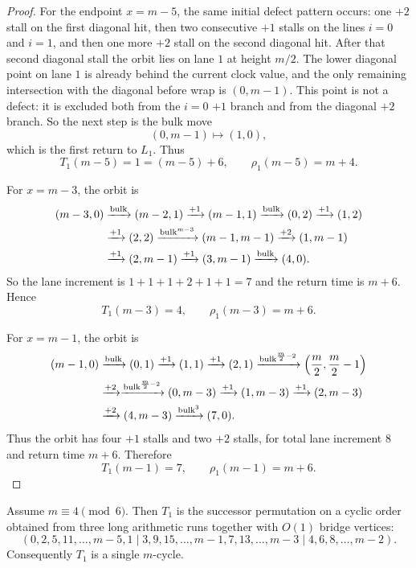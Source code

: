 \begin{proof}
For the endpoint $x=m-5$, the same initial defect pattern occurs: one $+2$ stall on the first diagonal hit,
then two consecutive $+1$ stalls on the lines $i=0$ and $i=1$, and then one more $+2$ stall on the second
diagonal hit.
After that second diagonal stall the orbit lies on lane $1$ at height $m/2$.
The lower diagonal point on lane $1$ is already behind the current clock value, and the only remaining
intersection with the diagonal before wrap is $(0,m-1)$.
This point is not a defect: it is excluded both from the $i=0$ $+1$ branch and from the diagonal $+2$
branch.
So the next step is the bulk move
\[
(0,m-1)\mapsto(1,0),
\]
which is the first return to $L_1$.
Thus
\[
T_1(m-5)=1=(m-5)+6,\qquad \rho_1(m-5)=m+4.
\]

For $x=m-3$, the orbit is
\[
\begin{aligned}
(m-3,0)&\xrightarrow{\mathrm{bulk}}(m-2,1)\xrightarrow{+1}(m-1,1)\xrightarrow{\mathrm{bulk}}(0,2)\xrightarrow{+1}(1,2)\\
&\xrightarrow{+1}(2,2)\xrightarrow{\mathrm{bulk}^{m-3}}(m-1,m-1)\xrightarrow{+2}(1,m-1)\\
&\xrightarrow{+1}(2,m-1)\xrightarrow{+1}(3,m-1)\xrightarrow{\mathrm{bulk}}(4,0).
\end{aligned}
\]
So the lane increment is $1+1+1+2+1+1=7$ and the return time is $m+6$.
Hence
\[
T_1(m-3)=4,\qquad \rho_1(m-3)=m+6.
\]

For $x=m-1$, the orbit is
\[
\begin{aligned}
(m-1,0)&\xrightarrow{\mathrm{bulk}}(0,1)\xrightarrow{+1}(1,1)\xrightarrow{+1}(2,1)
\xrightarrow{\mathrm{bulk}^{\frac m2-2}}\left(\frac m2,\frac m2-1\right)\\
&\xrightarrow{+2}\xrightarrow{\mathrm{bulk}^{\frac m2-2}}(0,m-3)\xrightarrow{+1}(1,m-3)
\xrightarrow{+1}(2,m-3)\\
&\xrightarrow{+2}(4,m-3)\xrightarrow{\mathrm{bulk}^3}(7,0).
\end{aligned}
\]
Thus the orbit has four $+1$ stalls and two $+2$ stalls, for total lane increment $8$ and return time
$m+6$.
Therefore
\[
T_1(m-1)=7,\qquad \rho_1(m-1)=m+6.
\]
\end{proof}

\begin{proposition}\label{prop:R1-caseII-blocks}
Assume $m\equiv 4\pmod 6$.
Then $T_1$ is the successor permutation on a cyclic order obtained from three long arithmetic runs together with $O(1)$ bridge vertices:
\[
(0,2,5,11,\dots,m-5,1\mid 3,9,15,\dots,m-1,7,13,\dots,m-3\mid 4,6,8,\dots,m-2).
\]
Consequently $T_1$ is a single $m$-cycle.
\end{proposition}

